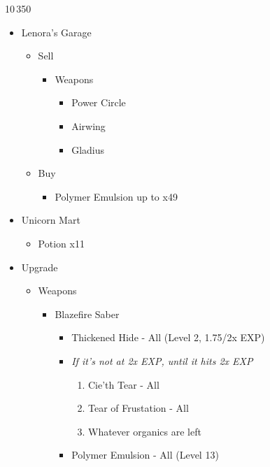 \begin{paracol}{2}
	\begin{shop}{10\,350}
		\begin{itemize}
			\item Lenora's Garage
			      \begin{itemize}
				      \item Sell
				            \begin{itemize}
					            \item Weapons
					                  \begin{itemize}
						                  \item Power Circle
						                  \item Airwing
						                  \item Gladius
					                  \end{itemize}
				            \end{itemize}
				      \item Buy
				            \begin{itemize}
					            \item Polymer Emulsion up to x49
				            \end{itemize}
			      \end{itemize}
			\item Unicorn Mart
			      \begin{itemize}
				      \item Potion x11
			      \end{itemize}
		\end{itemize}
	\end{shop}
	\begin{upgrade}
		\begin{itemize}
			\item Upgrade
			      \begin{itemize}
				      \item Weapons
				            \begin{itemize}
					            \item Blazefire Saber
					                  \begin{itemize}
						                  \item Thickened Hide - All (Level 2, 1.75/2x EXP)
						                  \item \textit{If it's not at 2x EXP, until it hits 2x EXP}
						                        \begin{enumerate}
							                        \item Cie'th Tear - All
							                        \item Tear of Frustation - All
							                        \item Whatever organics are left
						                        \end{enumerate}
						                  \item Polymer Emulsion - All (Level 13)
					                  \end{itemize}
				            \end{itemize}
			      \end{itemize}
		\end{itemize}
	\end{upgrade}



\end{paracol}

